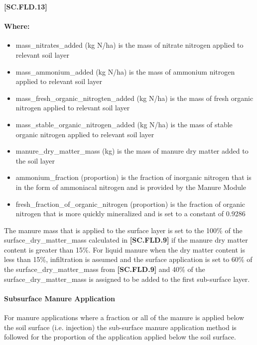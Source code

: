             {\raggedleft \textbf{[SC.FLD.13]}\par}
            \vspace{0.5cm} 

\paragraph{Where:}
\begin{itemize}
    \item mass\_nitrates\_added (kg N/ha) is the mass of nitrate nitrogen applied to relevant soil layer
    \item mass\_ammonium\_added (kg N/ha) is the mass of ammonium nitrogen applied to relevant soil layer
    \item mass\_fresh\_organic\_nitrogten\_added (kg N/ha) is the mass of fresh organic nitrogen applied to relevant soil layer
    \item mass\_stable\_organic\_nitrogen\_added (kg N/ha) is the mass of stable organic nitrogen applied to relevant soil layer
    \item manure\_dry\_matter\_mass (kg) is the mass of manure dry matter added to the soil layer
    \item ammonium\_fraction (proportion) is the fraction of inorganic nitrogen that is in the form of ammoniacal nitrogen and is provided by the Manure Module
    \item fresh\_fraction\_of\_organic\_nitrogen (proportion) is the fraction of organic nitrogen that is more quickly mineralized and is set to a constant of 0.9286
\end{itemize}

The manure mass that is applied to the surface layer is set to the 100\% of the surface\_dry\_matter\_mass calculated in \textbf{[SC.FLD.9]} if the manure dry matter content is greater than 15\%. For liquid manure when the dry matter content is less than 15\%, infiltration is assumed and the surface application is set to 60\% of the surface\_dry\_matter\_mass from \textbf{[SC.FLD.9]}  and 40\% of the surface\_dry\_matter\_mass is assigned to be added to the first sub-surface layer.

\paragraph{Subsurface Manure Application}
\vspace{-0.25cm}

For manure applications where a fraction or all of the manure is applied below the soil surface (i.e. injection) the sub-surface manure application method is followed for the proportion of the application applied below the soil surface. 

